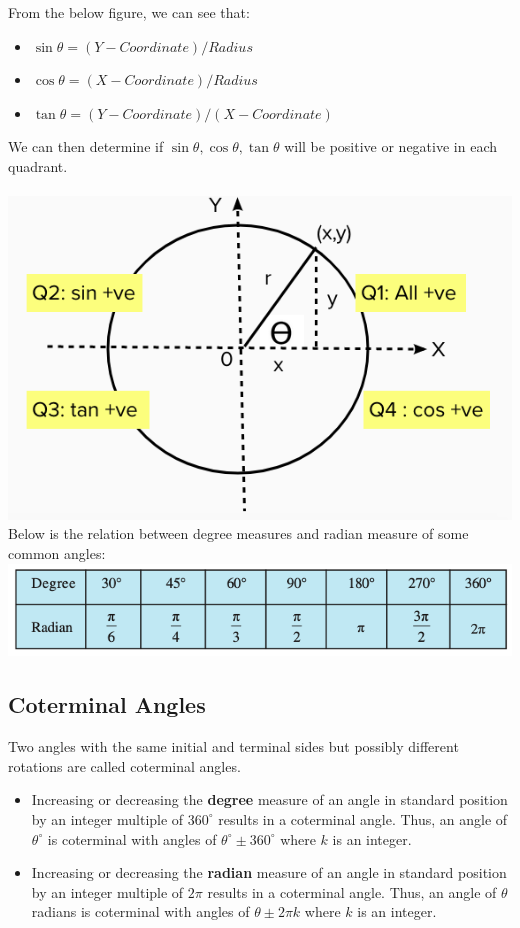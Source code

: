 \documentclass{book}
\begin{document}
	  	From the below figure, we can see that:
	  	\begin{itemize}
	  		\item $\sin\theta = (Y-Coordinate)/Radius$
	  		\item $\cos\theta = (X-Coordinate)/Radius$
	  		\item $\tan\theta = (Y-Coordinate)/(X-Coordinate)$
	  		\end{itemize}
	  		We can then determine if $\sin\theta, \cos\theta, \tan\theta$ will be positive or negative in each quadrant. \\ \\
	  		\includegraphics[scale=0.6]{unitcircle} \\
	  		
	  		Below is the relation between degree measures and radian measure of some common angles: \\
	  		
	  		\includegraphics[scale=0.6]{raddegree}
	  		
	  		\subsection{Coterminal Angles}
	  		Two angles with the same initial and terminal sides but possibly different rotations are called coterminal angles.
	  		\begin{itemize}
				\item Increasing or decreasing the \textbf{degree} measure of an angle in standard position by an integer multiple of $360^\circ$ results in a coterminal angle. Thus, an angle of $\theta^\circ$ is coterminal with angles of $\theta^\circ \pm 360^\circ$ where $k$ is an integer.
					\item Increasing or decreasing the \textbf{radian} measure of an angle in standard position by an integer multiple of $2\pi$ results in a coterminal angle. Thus, an angle of $\theta$ radians is coterminal with angles of $\theta \pm 2 \pi k$ where $k$ is an integer.
	  		\end{itemize}
	 
\end{document}
